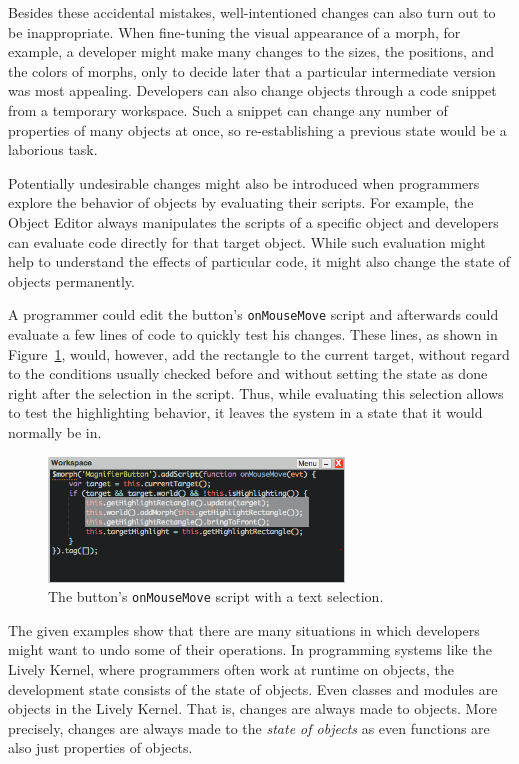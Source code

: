 Besides these accidental mistakes, well-intentioned changes can also turn out to be inappropriate.
When fine-tuning the visual appearance of a morph, for example, a developer might make many changes to the sizes, the positions, and the colors of morphs, only to decide later that a particular intermediate version was most appealing.
Developers can also change objects through a code snippet from a temporary workspace.
Such a snippet can change any number of properties of many objects at once, so re-establishing a previous state would be a laborious task.

Potentially undesirable changes might also be introduced when programmers explore the behavior of objects by evaluating their scripts.
For example, the Object Editor always manipulates the scripts of a specific object and developers can evaluate code directly for that target object.
While such evaluation might help to understand the effects of particular code, it might also change the state of objects permanently.

A programmer could edit the button's \lstinline{onMouseMove} script and afterwards could evaluate a few lines of code to quickly test his changes.
These lines, as shown in Figure~\ref{fig:onMouseOverScript}, would, however, add the rectangle to the current target, without regard to the conditions usually checked before and without setting the state as done right after the selection in the script.
Thus, while evaluating this selection allows to test the highlighting behavior, it leaves the system in a state that it would normally be in.

\begin{figure}[h]
    \centering
    \includegraphics[width=0.7\textwidth]{figures/3_motivation/4_workspaceDoIt.png}
    \caption{The button's \lstinline{onMouseMove} script with a text selection.}
    \label{fig:onMouseOverScript}
\end{figure}

The given examples show that there are many situations in which developers might want to undo some of their operations.
In programming systems like the Lively Kernel, where programmers often work at runtime on objects, the development state consists of the state of objects.
Even classes and modules are objects in the Lively Kernel.
That is, changes are always made to objects.
More precisely, changes are always made to the \emph{state of objects} as even functions are also just properties of objects.

